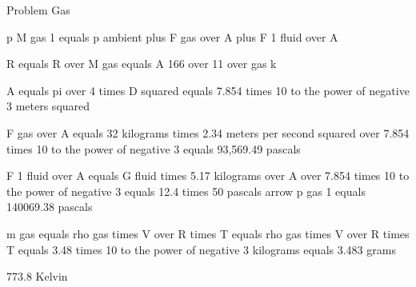 Problem Gas

p M gas 1 equals p ambient plus F gas over A plus F 1 fluid over A

R equals R over M gas equals A 166 over 11 over gas k

A equals pi over 4 times D squared equals 7.854 times 10 to the power of negative 3 meters squared

F gas over A equals 32 kilograms times 2.34 meters per second squared over 7.854 times 10 to the power of negative 3 equals 93,569.49 pascals

F 1 fluid over A equals G fluid times 5.17 kilograms over A over 7.854 times 10 to the power of negative 3 equals 12.4 times 50 pascals arrow p gas 1 equals 140069.38 pascals

m gas equals rho gas times V over R times T equals rho gas times V over R times T equals 3.48 times 10 to the power of negative 3 kilograms equals 3.483 grams

773.8 Kelvin